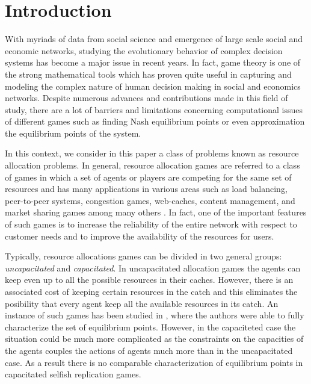 \section{Introduction}
With myriads of data from social science and emergence of large scale social and economic networks, studying the evolutionary behavior of complex decision systems has become a major issue in recent years. In fact, game theory is one of the strong mathematical tools which has proven quite useful in capturing and modeling the complex nature of human decision making in social and economics networks. Despite numerous advances and contributions made in this field of study, there are a lot of barriers and limitations concerning computational issues of different games such as finding Nash equilibrium points or even approximation the equilibrium points of the system.  
 

In this context, we consider in this paper a class of problems known as resource allocation problems. In general, resource allocation games are referred to a class of games in which a set of agents or players are competing for the same set of resources and has many applications in various areas such as load balancing, peer-to-peer systems, congestion games, web-caches, content management, and market sharing games among many others \cite{pollatos2008social,pacifici2012convergence,gopalakrishnan2012cache,goemans2006market,masucci2014strategic,ackermann2008impact,fabrikant2004complexity}. In fact, one of the important features of such games is to increase the reliability of the entire network with respect to customer needs and to improve the availability of the resources for users.            

Typically, resource allocations games can be divided in two general groups: \textit{uncapacitated} and \textit{capacitated}. In uncapacitated allocation games the agents can keep even up to all the possible resources in their caches. However, there is an associated cost of keeping certain resources in the catch and this eliminates the posibility that every agent keep all the available resources in its catch. An instance of such games has been studied in \cite{chun2004selfish}, where the authors were able to fully characterize the set of equilibrium points. However, in the capaciteted case the situation could be much more complicated as the constraints on the capacities of the agents couples the actions of agents much more than in the uncapacitated case. As a result there is no comparable characterization of equilibrium points in capacitated selfish replication games. 

